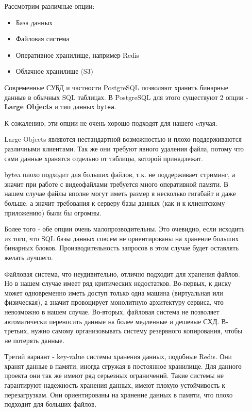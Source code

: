 Рассмотрим различные опции:

\begin{itemize}
	\item База данных
	\item Файловая система
	\item Оперативное хранилище, например Redis
	\item Облачное хранилище (S3)
\end{itemize}

Современные СУБД и частности PostgreSQL позволяют хранить бинарные данные в обычных SQL таблицах. В PostgreSQL для этого существуют 2 опции - \textbf{Large Objects} и тип данных \texttt{bytea}.

К сожалению, эти опции не очень хорошо подходят для нашего cлучая.

Large Objects являются нестандартной возможностью и плохо поддерживаются различными клиентами. Так же они требуют явного удаления файла, потому что сами данные хранятся отдельно от таблицы, которой принадлежат.

bytea плохо подходит для больших файлов, т.к. не поддерживает стриминг, а значит при работе с видеофайлами требуется много оперативной памяти. В нашем случае файлы вполне могут иметь размер в несколько гигабайт и даже больше, а значит требования к серверу базы данных (как и к клиентскому приложению) были бы огромны.

Более того - обе опции очень малопрозводительны. Это очевидно, если исходить из того, что SQL базы данных совсем не ориентированы на хранение больших бинарных блоков. Производительность запросов в этом случае будет оставлять желать лучшего.

Файловая система, что неудивительно, отлично подходит для хранения файлов. Но в нашем случае имеет ряд критических недостатков. Во-первых, к диску может одновременно иметь доступ только одна машина (виртуальная или физическая), а значит провоцирует монолитную архитектуру сервиса, что невозможно в нашем случае. Во-вторых, файловая система не позволяет автоматически переносить данные на более медленные и дешевые СХД. В-третьих, нужно самому организовывать систему резервного копирования, чтобы не потерять данные.

Третий вариант - key-value системы хранения данных, подобные Redis. Они хранят данные в памяти, иногда сгружая в постоянное хранилище. Для данного проекта они так же имеют ряд серьезных ограничений. Такие системы не гарантируют надежность хранения данных, имеют плохую устойчивость к перезагрузкам. Они ориентированы на хранение данных в памяти, что плохо подходит для больших файлов.

